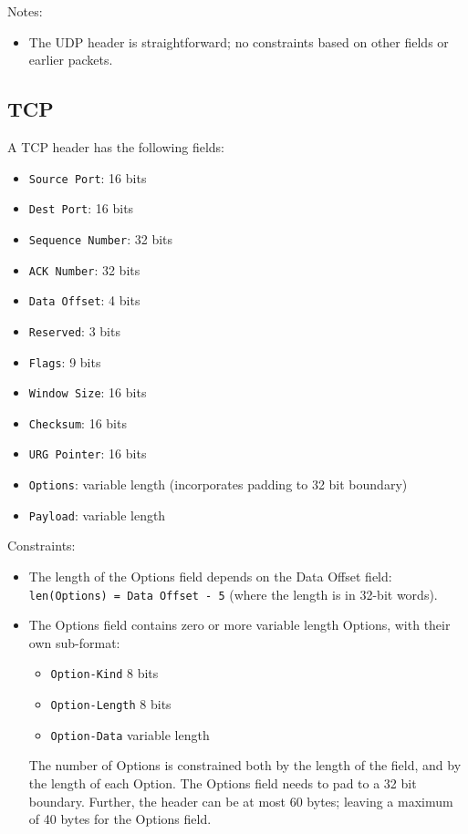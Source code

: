 \documentclass[10pt,a4paper]{article}
\begin{document}
Notes:
\begin{itemize}
\item The UDP header is straightforward; no constraints based on other fields or earlier packets.
\end{itemize}

\subsection{TCP}

A TCP header has the following fields:
\begin{itemize}
\item \texttt{Source Port}: 16 bits
\item \texttt{Dest Port}: 16 bits
\item \texttt{Sequence Number}: 32 bits
\item \texttt{ACK Number}: 32 bits
\item \texttt{Data Offset}: 4 bits
\item \texttt{Reserved}: 3 bits
\item \texttt{Flags}: 9 bits
\item \texttt{Window Size}: 16 bits
\item \texttt{Checksum}: 16 bits
\item \texttt{URG Pointer}: 16 bits
\item \texttt{Options}: variable length (incorporates padding to 32 bit boundary)
\item \texttt{Payload}: variable length
\end{itemize}

Constraints:
\begin{itemize}
\item The length of the Options field depends on the Data Offset field:
\texttt{len(Options) = Data Offset - 5} (where the length is in 32-bit words).
\item The Options field contains zero or more variable length Options, with their own
sub-format:
\begin{itemize}
\item \texttt{Option-Kind} 8 bits
\item \texttt{Option-Length} 8 bits
\item \texttt{Option-Data} variable length
\end{itemize}
The number of Options is constrained both by the length of the field, and by the length
of each Option. The Options field needs to pad to a 32 bit boundary. Further, the header
can be at most 60 bytes; leaving a maximum of 40 bytes for the Options field.
\end{itemize}
\end{document}
